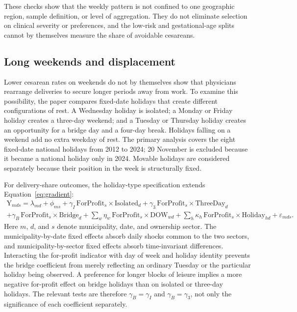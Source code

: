 




These checks show that the weekly pattern is not confined to one geographic
region, sample definition, or level of aggregation. They do not eliminate
selection on clinical severity or preferences, and the low-risk and
gestational-age splits cannot by themselves measure the share of avoidable
cesareans.

\subsection{Long weekends and displacement}

Lower cesarean rates on weekends do not by themselves show that physicians
rearrange deliveries to secure longer periods away from work. To examine this
possibility, the paper compares fixed-date holidays that create different
configurations of rest. A Wednesday holiday is isolated; a Monday or Friday holiday
creates a three-day weekend; and a Tuesday or Thursday holiday creates an
opportunity for a bridge day and a four-day break. Holidays falling on a weekend
add no extra weekday of rest. The primary analysis covers the eight fixed-date
national holidays from 2012 to 2024; 20 November is excluded because it became a
national holiday only in 2024. Movable holidays are considered separately because
their position in the week is structurally fixed.

For delivery-share outcomes, the holiday-type specification extends
Equation~\eqref{eq:gradient}:
\begin{multline}
\text{Y}_{mds} = \lambda_{md} + \phi_{ms}
  + \gamma_I\,\text{ForProfit}_{s}\!\times\!\text{Isolated}_{d}
  + \gamma_3\,\text{ForProfit}_{s}\!\times\!\text{ThreeDay}_{d} \\
  + \gamma_B\,\text{ForProfit}_{s}\!\times\!\text{Bridge}_{d}
  + \sum_{w}\eta_w\,\text{ForProfit}_{s}\!\times\!\text{DOW}_{wd}
  + \sum_{h}\kappa_h\,\text{ForProfit}_{s}\!\times\!\text{Holiday}_{hd}
  + \varepsilon_{mds}.
\label{eq:blocks}
\end{multline}
Here $m$, $d$, and $s$ denote municipality, date, and ownership sector. The
municipality-by-date fixed effects absorb daily shocks common to the two sectors,
and municipality-by-sector fixed effects absorb time-invariant differences.
Interacting the for-profit indicator with day of week and holiday identity
prevents the bridge coefficient from merely reflecting an ordinary Tuesday or the
particular holiday being observed. A preference for longer blocks of leisure
implies a more negative for-profit effect on bridge holidays than on isolated or
three-day holidays. The relevant tests are therefore $\gamma_B=\gamma_I$ and
$\gamma_B=\gamma_3$, not only the significance of each coefficient separately.

